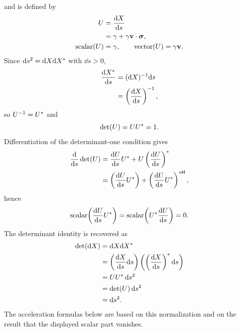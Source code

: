 and is defined by
\begin{align*}
U&=\frac{\mathrm dX}{\mathrm d s}\notag\\
&=\gamma+\gamma\mathbf{v}\cdot\mathbf{\bm{\sigma}},\\
\operatorname{scalar}(U)&=\gamma,\qquad
\operatorname{vector}(U)=\gamma\mathbf{v}.
\end{align*}
Since \(\mathrm d s^2=\mathrm dX\mathrm dX^{*}\) with \(\dd s>0\),
\begin{align*}
\frac{\mathrm dX^{*}}{\mathrm d s}
&=(\mathrm dX)^{-1}\mathrm d s\notag\\
&=\left(\frac{\mathrm dX}{\mathrm d s}\right)^{-1},
\end{align*}
so \(U^{-1}=U^*\) and
\begin{equation*}
\operatorname{det}\!\left(U\right)=UU^*=1.
\end{equation*}
Differentiation of the determinant-one condition gives
\begin{align*}
\frac{\mathrm d}{\mathrm d s}\operatorname{det}\!\left(U\right)
&=\frac{\mathrm dU}{\mathrm d s}U^*+U\left(\frac{\mathrm dU}{\mathrm d s}\right)^*\notag\\
&=\left(\frac{\mathrm dU}{\mathrm d s}U^*\right)+\left(\frac{\mathrm dU}{\mathrm d s}U^*\right)^{*\mathsf H},
\end{align*}
hence
\begin{equation*}
\operatorname{scalar}\!\left(\frac{\mathrm dU}{\mathrm d s}U^*\right)
=\operatorname{scalar}\!\left(U^*\frac{\mathrm dU}{\mathrm d s}\right)
=0.
\end{equation*}
The determinant identity is recovered as
\begin{align*}
\operatorname{det}\!\left(\mathrm dX\right)
&=\mathrm dX\mathrm dX^{*}\notag\\
&=\left(\frac{\mathrm dX}{\mathrm d s}\mathrm d s\right)\left(\left(\frac{\mathrm dX}{\mathrm d s}\right)^*\mathrm d s\right)\notag\\
&=UU^*\,\mathrm d s^2\notag\\
&=\operatorname{det}\!\left(U\right)\mathrm d s^2\notag\\
&=\mathrm d s^2.
\end{align*}
The acceleration formulas below are based on this normalization and on the
result that the displayed scalar part vanishes.


